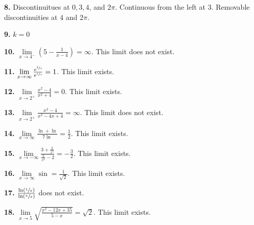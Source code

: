\documentclass[12pt,]{book}
\theoremstyle{plain}
\theoremstyle{definition}
\numberwithin{equation}{section}
\newcommand{\fe}[2]{\mathop{{#1}{\left(#2\right)}}}
\begin{document}
            \par\smallskip
\noindent\textbf{8.}\quad{}
                Discontinuitues at \(0,3,4\), and \(2\pi\). Continuous from the left at \(3\). Removable discontinuities at \(4\) and \(2\pi\).%

            \par\smallskip
\noindent\textbf{9.}\quad{}
                \(k=0\)%

            \par\smallskip
\noindent\textbf{10.}\quad{}
                    \(\lim\limits_{x\to4^{-}}\left(5-\frac{1}{x-4}\right)=\infty\). This limit does not exist.%

                \par\smallskip
\noindent\textbf{11.}\quad{}
                    \(\lim\limits_{x\to\infty}\frac{e^{\sfrac{2}{x}}}{e^{\sfrac{1}{x}}}=1\). This limit exists.%

                \par\smallskip
\noindent\textbf{12.}\quad{}
                    \(\lim\limits_{x\to2^{+}}\frac{x^2-4}{x^2+4}=0\). This limit exists.%

                \par\smallskip
\noindent\textbf{13.}\quad{}
                    \(\lim\limits_{x\to2^{+}}\frac{x^2-4}{x^2-4x+4}=\infty\). This limit does not exist.%

                \par\smallskip
\noindent\textbf{14.}\quad{}
                    \(\lim\limits_{x\to\infty}\frac{\fe{\ln}{x}+\fe{\ln}{x^6}}{7\fe{\ln}{x^2}}=\frac{1}{2}\). This limit exists.%

                \par\smallskip
\noindent\textbf{15.}\quad{}
                    \(\lim\limits_{x\to-\infty}\frac{3+\frac{2}{x^2}}{\frac{3}{x^2}-2}=-\frac{3}{2}\). This limit exists.%

                \par\smallskip
\noindent\textbf{16.}\quad{}
                    \(\lim\limits_{x\to\infty}\fe{\sin}{\frac{\pi e^{3x}}{2e^x+4e^{3x}}}=\frac{1}{\sqrt{2}}\). This limit exists.%

                \par\smallskip
\noindent\textbf{17.}\quad{}
                    \(\frac{\fe{\ln}{\sfrac{1}{x}}}{\fe{\ln}{\sfrac{x}{x}}}\) does not exist.%

                \par\smallskip
\noindent\textbf{18.}\quad{}
                    \(\lim\limits_{x\to5}\sqrt{\frac{x^2-12x+35}{5-x}}=\sqrt{2}\). This limit exists.%
\end{document}
